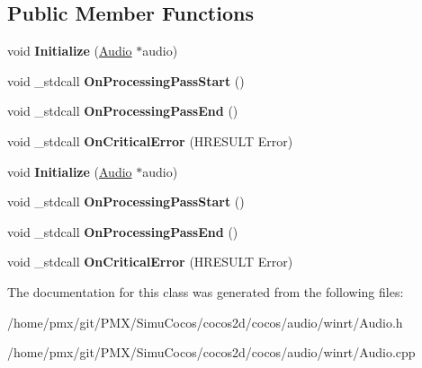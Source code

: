 \subsection*{Public Member Functions}
\begin{DoxyCompactItemize}
\item 
\mbox{\label{classAudioEngineCallbacks_af05e1d029d255bb945ee71a4c49a7413}} 
void {\bfseries Initialize} (\hyperlink{classAudio}{Audio} $\ast$audio)
\item 
\mbox{\label{classAudioEngineCallbacks_af67d10b992b5736f03f8b390a4b6e1ae}} 
void \+\_\+stdcall {\bfseries On\+Processing\+Pass\+Start} ()
\item 
\mbox{\label{classAudioEngineCallbacks_a9b4d95be6fd52a17cd0843157d843ab3}} 
void \+\_\+stdcall {\bfseries On\+Processing\+Pass\+End} ()
\item 
\mbox{\label{classAudioEngineCallbacks_ae78de66347daecb124f18ba75f8e1dd7}} 
void \+\_\+stdcall {\bfseries On\+Critical\+Error} (H\+R\+E\+S\+U\+LT Error)
\item 
\mbox{\label{classAudioEngineCallbacks_af05e1d029d255bb945ee71a4c49a7413}} 
void {\bfseries Initialize} (\hyperlink{classAudio}{Audio} $\ast$audio)
\item 
\mbox{\label{classAudioEngineCallbacks_af67d10b992b5736f03f8b390a4b6e1ae}} 
void \+\_\+stdcall {\bfseries On\+Processing\+Pass\+Start} ()
\item 
\mbox{\label{classAudioEngineCallbacks_a9b4d95be6fd52a17cd0843157d843ab3}} 
void \+\_\+stdcall {\bfseries On\+Processing\+Pass\+End} ()
\item 
\mbox{\label{classAudioEngineCallbacks_ae78de66347daecb124f18ba75f8e1dd7}} 
void \+\_\+stdcall {\bfseries On\+Critical\+Error} (H\+R\+E\+S\+U\+LT Error)
\end{DoxyCompactItemize}


The documentation for this class was generated from the following files\+:\begin{DoxyCompactItemize}
\item 
/home/pmx/git/\+P\+M\+X/\+Simu\+Cocos/cocos2d/cocos/audio/winrt/Audio.\+h\item 
/home/pmx/git/\+P\+M\+X/\+Simu\+Cocos/cocos2d/cocos/audio/winrt/Audio.\+cpp\end{DoxyCompactItemize}
